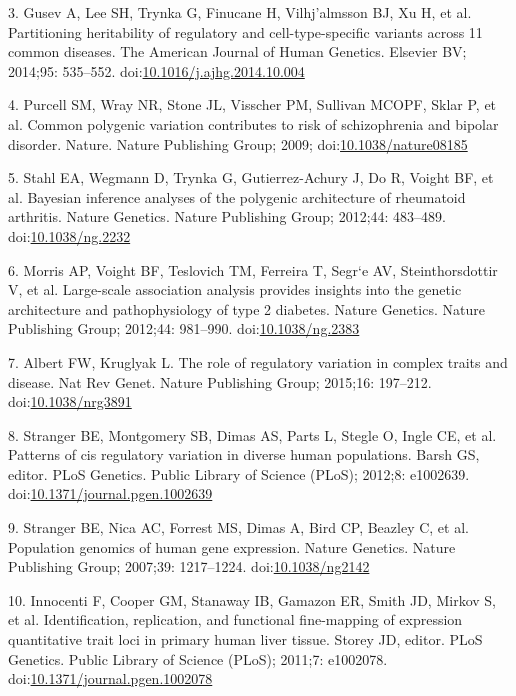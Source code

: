\documentclass[]{article}
\begin{document}
3. Gusev A, Lee SH, Trynka G, Finucane H, Vilhj{\a'a}lmsson BJ, Xu H, et
al. Partitioning heritability of regulatory and cell-type-specific
variants across 11 common diseases. The American Journal of Human
Genetics. Elsevier BV; 2014;95: 535--552.
doi:\href{http://dx.doi.org/10.1016/j.ajhg.2014.10.004}{10.1016/j.ajhg.2014.10.004}

4. Purcell SM, Wray NR, Stone JL, Visscher PM, Sullivan MCOPF, Sklar P,
et al. Common polygenic variation contributes to risk of schizophrenia
and bipolar disorder. Nature. Nature Publishing Group; 2009;
doi:\href{http://dx.doi.org/10.1038/nature08185}{10.1038/nature08185}

5. Stahl EA, Wegmann D, Trynka G, Gutierrez-Achury J, Do R, Voight BF,
et al. Bayesian inference analyses of the polygenic architecture of
rheumatoid arthritis. Nature Genetics. Nature Publishing Group; 2012;44:
483--489. doi:\href{http://dx.doi.org/10.1038/ng.2232}{10.1038/ng.2232}

6. Morris AP, Voight BF, Teslovich TM, Ferreira T, Segr{\a`e} AV,
Steinthorsdottir V, et al. Large-scale association analysis provides
insights into the genetic architecture and pathophysiology of type 2
diabetes. Nature Genetics. Nature Publishing Group; 2012;44: 981--990.
doi:\href{http://dx.doi.org/10.1038/ng.2383}{10.1038/ng.2383}

7. Albert FW, Kruglyak L. The role of regulatory variation in complex
traits and disease. Nat Rev Genet. Nature Publishing Group; 2015;16:
197--212. doi:\href{http://dx.doi.org/10.1038/nrg3891}{10.1038/nrg3891}

8. Stranger BE, Montgomery SB, Dimas AS, Parts L, Stegle O, Ingle CE, et
al. Patterns of cis regulatory variation in diverse human populations.
Barsh GS, editor. PLoS Genetics. Public Library of Science (PLoS);
2012;8: e1002639.
doi:\href{http://dx.doi.org/10.1371/journal.pgen.1002639}{10.1371/journal.pgen.1002639}

9. Stranger BE, Nica AC, Forrest MS, Dimas A, Bird CP, Beazley C, et al.
Population genomics of human gene expression. Nature Genetics. Nature
Publishing Group; 2007;39: 1217--1224.
doi:\href{http://dx.doi.org/10.1038/ng2142}{10.1038/ng2142}

10. Innocenti F, Cooper GM, Stanaway IB, Gamazon ER, Smith JD, Mirkov S,
et al. Identification, replication, and functional fine-mapping of
expression quantitative trait loci in primary human liver tissue. Storey
JD, editor. PLoS Genetics. Public Library of Science (PLoS); 2011;7:
e1002078.
doi:\href{http://dx.doi.org/10.1371/journal.pgen.1002078}{10.1371/journal.pgen.1002078}
\end{document}
